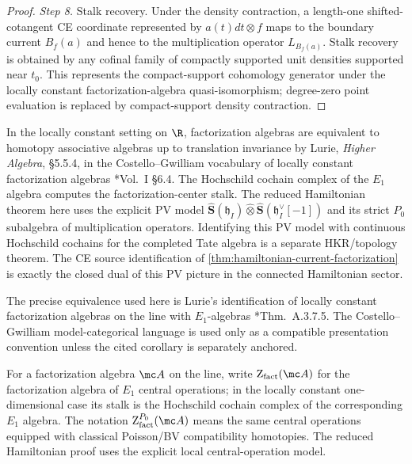 \documentclass[11pt]{memoir}
\begin{document}
\begin{proof}
  \emph{Step 8.} Stalk recovery. Under the density contraction, a
  length-one shifted-cotangent CE coordinate represented by
  \(a(t)dt\otimes f\) maps to the boundary current \(B_f(a)\) and hence
  to the multiplication operator
  \(L_{B_f(a)}\). Stalk recovery is obtained by any cofinal family of
  compactly supported unit densities supported near \(t_0\). This
  represents the compact-support cohomology generator under the locally
  constant factorization-algebra quasi-isomorphism; degree-zero point
  evaluation is replaced by compact-support density contraction.
\end{proof}

\begin{rmk}\label{rmk:E1-translation}
  In the locally constant setting on $\R$, factorization algebras are
  equivalent to homotopy associative algebras up to translation
  invariance by Lurie, \emph{Higher Algebra}, \S 5.5.4, in the
	  Costello--Gwilliam vocabulary of locally constant factorization
	  algebras \cite{costello-gwilliam}*{Vol.~I \S 6.4}. The Hochschild
	  cochain complex of the $E_1$ algebra computes the
	  factorization-center stalk.  The reduced Hamiltonian theorem here
	  uses the explicit PV model
	  $\widehat{\mathbf S}(\mathfrak h_I)\widehat\otimes
	  \widehat{\mathbf S}(\mathfrak h_I^\vee[-1])$ and its strict $P_0$
	  subalgebra of multiplication operators.  Identifying this PV model
	  with continuous Hochschild cochains for the completed Tate algebra is
	  a separate HKR/topology theorem. The CE source
	  identification of
  \ref{thm:hamiltonian-current-factorization} is exactly the
  closed dual of this PV picture in the connected Hamiltonian sector.
\end{rmk}

\begin{rmk}\label{rmk:lurie-cg-quillen-equivalence}
  The precise equivalence used here is Lurie's identification of locally
  constant factorization algebras on the line with \(E_1\)-algebras
  \cite{lurie-ha}*{Thm.~A.3.7.5}.  The Costello--Gwilliam
  model-categorical language is used only as a compatible presentation
  convention unless the cited corollary is separately anchored.
\end{rmk}

For a factorization algebra $\mc A$ on the line, write
$\mathrm Z_{\mathrm{fact}}(\mc A)$ for the factorization algebra of $E_1$
central operations; in the locally constant one-dimensional case its
stalk is the Hochschild cochain complex of the corresponding $E_1$
algebra.  The notation $\mathrm Z^{P_0}_{\mathrm{fact}}(\mc A)$ means
the same central operations equipped with classical Poisson/BV
compatibility homotopies.  The reduced Hamiltonian proof uses the
explicit local central-operation model.
\end{document}
